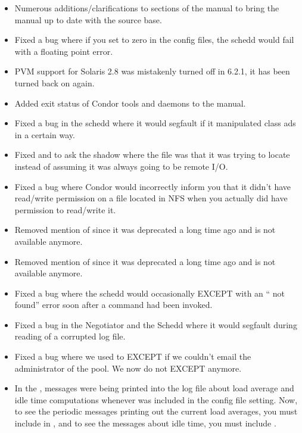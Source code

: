 \begin{itemize}
\item Numerous additions/clarifications to sections of the manual to bring
the manual up to date with the source base.

\item Fixed a bug where if you set  to zero in the
config files, the schedd would fail with a floating point error.

\item PVM support for Solaris 2.8 was mistakenly turned off in 6.2.1,
it has been turned back on again.

\item Added exit status of Condor tools and daemons to the manual.

\item Fixed a bug in the schedd where it would segfault if it manipulated
class ads in a certain way.

\item Fixed  and  to ask the shadow where the
file was that it was trying to locate instead of assuming it was always going
to be remote I/O.

\item Fixed a bug where Condor would incorrectly inform you that it
didn't have read/write permission on a file located in NFS when you
actually did have permission to read/write it.

\item Removed mention of  since it was deprecated a
long time ago and is not available anymore.

\item Removed mention of  since it was deprecated a
long time ago and is not available anymore.

\item Fixed a bug where the schedd would occasionally EXCEPT with an
`` not found'' error soon after a 
command had been invoked.

\item Fixed a bug in the Negotiator and the Schedd where it would segfault
during reading of a corrupted log file.

\item Fixed a bug where we used to EXCEPT if we couldn't email the
administrator of the pool. We now do not EXCEPT anymore.

\item In the , messages were being printed into the log
file about load average and idle time computations whenever
 was included in the  config
file setting.
Now, to see the periodic messages printing out the current load
averages, you must include  in , and
to see the messages about idle time, you must include .


\end{itemize}
